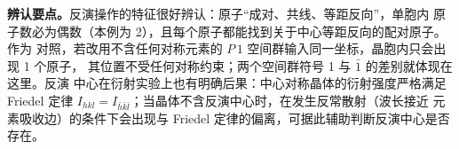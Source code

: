 \textbf{辨认要点。}反演操作的特征很好辨认：原子``成对、共线、等距反向''，单胞内
原子数必为偶数（本例为 2），且每个原子都能找到关于中心等距反向的配对原子。作为
对照，若改用不含任何对称元素的 $P\,1$ 空间群输入同一坐标，晶胞内只会出现 1 个原子，
其位置不受任何对称约束；两个空间群符号 1 与 $\bar1$ 的差别就体现在这里。反演
中心在衍射实验上也有明确后果：中心对称晶体的衍射强度严格满足 Friedel 定律
$I_{hkl}=I_{\bar h\bar k\bar l}$；当晶体不含反演中心时，在发生反常散射（波长接近
元素吸收边）的条件下会出现与 Friedel 定律的偏离，可据此辅助判断反演中心是否存在。

